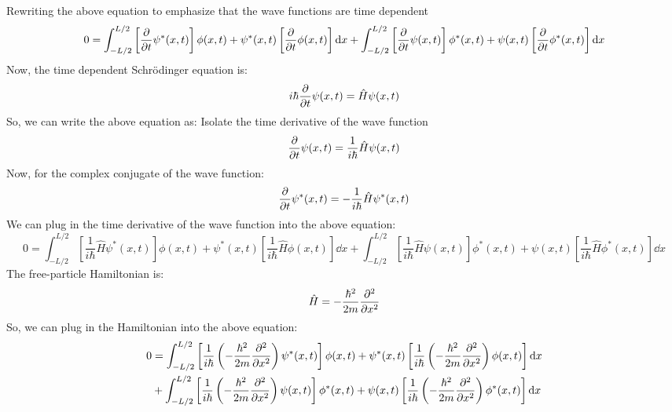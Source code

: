 \documentclass[12pt]{article}
\begin{document}
Rewriting the above equation to emphasize that the wave functions are time dependent
\begin{equation}
  0=\int_{-L / 2}^{L / 2} \left[\pdv{t}\psi^*(x,t)\right]\phi(x,t)+\psi^*(x,t)\left[\pdv{t}\phi(x,t)\right]\dd{x}+\int_{-L / 2}^{L / 2} \left[\pdv{t}\psi(x,t)\right]\phi^*(x,t)+\psi(x,t)\left[\pdv{t}\phi^*(x,t)\right] \dd{x}
\end{equation}
Now, the time dependent Schrödinger equation is:
\begin{equation}
  i\hbar\pdv{t}\psi(x,t)=\hat{H}\psi(x,t)
\end{equation}
So, we can write the above equation as:
Isolate the time derivative of the wave function
\begin{equation}
  \pdv{t}\psi(x,t)=\frac{1}{i\hbar}\hat{H}\psi(x,t)
\end{equation}
Now, for the complex conjugate of the wave function:
\begin{equation}
  \pdv{t}\psi^*(x,t)=-\frac{1}{i\hbar}\hat{H}\psi^*(x,t)
\end{equation}
We can plug in the time derivative of the wave function into the above equation:
\begin{equation}
  0=\int_{-L / 2}^{L / 2} \left[\frac{1}{i\hbar}\hat{H}\psi^*(x,t)\right]\phi(x,t)+\psi^*(x,t)\left[\frac{1}{i\hbar}\hat{H}\phi(x,t)\right]\dd{x}+\int_{-L / 2}^{L / 2} \left[\frac{1}{i\hbar}\hat{H}\psi(x,t)\right]\phi^*(x,t)+\psi(x,t)\left[\frac{1}{i\hbar}\hat{H}\phi^*(x,t)\right] \dd{x}
\end{equation}
The free-particle Hamiltonian is:
\begin{equation}
  \hat{H}=-\frac{\hbar^2}{2m}\pdv[2]{x}
\end{equation}
So, we can plug in the Hamiltonian into the above equation:
\begin{equation}
  \begin{aligned}
    0&=\int_{-L / 2}^{L / 2} \left[\frac{1}{i\hbar}\left(-\frac{\hbar^2}{2m}\pdv[2]{x}\right)\psi^*(x,t)\right]\phi(x,t)+\psi^*(x,t)\left[\frac{1}{i\hbar}\left(-\frac{\hbar^2}{2m}\pdv[2]{x}\right)\phi(x,t)\right]\dd{x}\\
    &+\int_{-L / 2}^{L / 2} \left[\frac{1}{i\hbar}\left(-\frac{\hbar^2}{2m}\pdv[2]{x}\right)\psi(x,t)\right]\phi^*(x,t)+\psi(x,t)\left[\frac{1}{i\hbar}\left(-\frac{\hbar^2}{2m}\pdv[2]{x}\right)\phi^*(x,t)\right] \dd{x}\\
  \end{aligned}
\end{equation}
\end{document}
